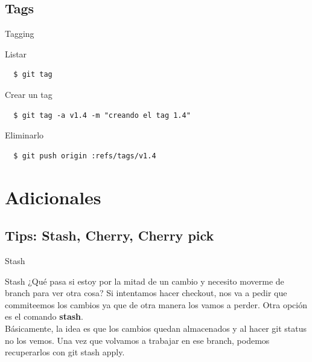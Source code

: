 \documentclass{beamer}
\begin{document}
\subsection{Tags}

\begin{frame}[fragile]{Tagging}
  \begin{block}{Listar}
    \begin{verbatim}
  $ git tag
    \end{verbatim}
  \end{block} 
  \pause
  \begin{block}{Crear un tag}
    \begin{verbatim}
  $ git tag -a v1.4 -m "creando el tag 1.4"
    \end{verbatim}
  \end{block}
  \pause
  \begin{block}{Eliminarlo}
    \begin{verbatim}
  $ git push origin :refs/tags/v1.4
    \end{verbatim}
  \end{block}
\end{frame}


\section{Adicionales}

\subsection{Tips: Stash, Cherry, Cherry pick}

\begin{frame}{Stash}
  \begin{block}{Stash}
  ¿Qué pasa si estoy por la mitad de un cambio y necesito moverme de branch para ver otra cosa? Si intentamos
  hacer checkout, nos va a pedir que commiteemos los cambios ya que de otra manera los vamos a perder. Otra opción
  es el comando \textbf{stash}. \footnotemark \\
  Básicamente, la idea es que los cambios quedan almacenados y al hacer git status no los vemos. Una vez que volvamos
  a trabajar en ese branch, podemos recuperarlos con git stash apply.
  \end{block}
  
\end{frame}
\end{document}
